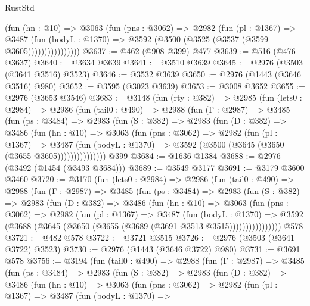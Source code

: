 \begin{lexlean}{RustStd}
\begin{coremodule}
                    (fun (hn : @10) =>
                    @3063
                      (fun (pns : @3062) =>
                      @2982
                        (fun (pl : @1367) =>
                        @3487
                          (fun (bodyL : @1370) =>
                          @3592 (@3500 (@3525 (@3537 (@3599 @3605))))))))))))))))
@3637 := @462 (@908 @399) @477
@3639 := @516 (@476 @3637)
@3640 := @3634 @3639
@3641 := @3510 @3639
@3645 := @2976 (@3503 (@3641 @3516) @3523)
@3646 := @3532 @3639
@3650 := @2976 (@1443 (@3646 @3516) @980)
@3652 := @3595 (@3023 @3639)
@3653 := @3008 @3652
@3655 := @2976 (@3653 @3546)
@3683 := @3148
    (fun (rty : @382) =>
    @2985
      (fun (lets0 : @2984) =>
      @2986
        (fun (tail0 : @490) =>
        @2988
          (fun (Γ : @2987) =>
          @3485
            (fun (ps : @3484) =>
            @2983
              (fun (S : @382) =>
              @2983
                (fun (D : @382) =>
                @3486
                  (fun (hn : @10) =>
                  @3063
                    (fun (pns : @3062) =>
                    @2982
                      (fun (pl : @1367) =>
                      @3487
                        (fun (bodyL : @1370) =>
                        @3592 (@3500 (@3645 (@3650 (@3655 @3605)))))))))))))))
    @399
@3684 := @1636 @1384
@3688 := @2976 (@3492 (@1454 (@3493 @3684)))
@3689 := @3549 @3177
@3691 := @3179 @3600 @3460
@3720 := @3170
    (fun (lets0 : @2984) =>
    @2986
      (fun (tail0 : @490) =>
      @2988
        (fun (Γ : @2987) =>
        @3485
          (fun (ps : @3484) =>
          @2983
            (fun (S : @382) =>
            @2983
              (fun (D : @382) =>
              @3486
                (fun (hn : @10) =>
                @3063
                  (fun (pns : @3062) =>
                  @2982
                    (fun (pl : @1367) =>
                    @3487
                      (fun (bodyL : @1370) =>
                      @3592 (@3688 (@3645 (@3650 (@3655 (@3689 (@3691 @3513 @3515))))))))))))))))
    @578
@3721 := @482 @578
@3722 := @3721 @3515
@3726 := @2976 (@3503 (@3641 @3722) @3523)
@3730 := @2976 (@1443 (@3646 @3722) @980)
@3731 := @3691 @578
@3756 := @3194
    (fun (tail0 : @490) =>
    @2988
      (fun (Γ : @2987) =>
      @3485
        (fun (ps : @3484) =>
        @2983
          (fun (S : @382) =>
          @2983
            (fun (D : @382) =>
            @3486
              (fun (hn : @10) =>
              @3063
                (fun (pns : @3062) =>
                @2982
                  (fun (pl : @1367) =>
                  @3487
                    (fun (bodyL : @1370) =>

\end{coremodule}
\end{lexlean}
